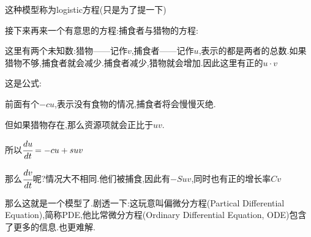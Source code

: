 {{{  这种模型称为logistic方程(只是为了提一下)

  接下来再来一个有意思的方程:捕食者与猎物的方程:

  这里有两个未知数:猎物——记作$v$,捕食者——记作$u$,表示的都是两者的总数.如果猎物不够,捕食者就会减少.捕食者减少,猎物就会增加.因此这里有正的$u \cdot v$

  这是公式:

  前面有个$-cu$,表示没有食物的情况,捕食者将会慢慢灭绝.

  但如果猎物存在,那么资源项就会正比于$uv$.

  所以$\cfrac{du}{dt} = -cu + suv$

  那么$\cfrac{dv}{dt}$呢?情况大不相同.他们被捕食,因此有$-Suv$,同时也有正的增长率$Cv$

  那么这就是一个模型了.剧透一下:这玩意叫偏微分方程(Partical Differential Equation),简称PDE,他比常微分方程(Ordinary Differential Equation, ODE)包含了更多的信息.也更难解.

}%

}%

}%

